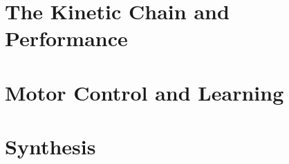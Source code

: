 \documentclass[10pt,letterpaper,openany]{book}
\theoremstyle{plain}
\begin{document}
\part{The Kinetic Chain and Performance}



\part{Motor Control and Learning}





\part{Synthesis}



\backmatter






\printindex
\end{document}
